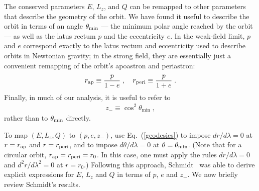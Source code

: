 \documentclass[aps,prd,twocolumn,showpacs,groupedaddress,nofootinbib]{revtex4}
\begin{document}
The conserved parameters $E$, $L_z$, and $Q$ can be remapped to other
parameters that describe the geometry of the orbit.  We have found it
useful to describe the orbit in terms of an angle $\theta_{\rm min}$
--- the minimum polar angle reached by the orbit --- as well as the
latus rectum $p$ and the eccentricity $e$.  In the weak-field limit,
$p$ and $e$ correspond exactly to the latus rectum and eccentricity
used to describe orbits in Newtonian gravity; in the strong field,
they are essentially just a convenient remapping of the orbit's
apoastron and periastron:
\begin{equation}
r_{\rm ap}\equiv\frac{p}{1-e}\;,\quad r_{\rm
peri}\equiv\frac{p}{1+e}\;.
\end{equation}
Finally, in much of our analysis, it is useful to refer to
\begin{gather}
z_{-}\equiv\cos^2\theta_{\min}\;,
\end{gather}
rather than to $\theta_{\rm min}$ directly.

To map $(E,L_z,Q)$ to $(p,e,z_{-})$, use Eq.\ (\ref{geodesics}) to
impose ${dr}/{d\lambda}=0$ at $r=r_{\rm ap}$ and $r=r_{\rm peri}$, and
to impose ${d\theta}/{d\lambda}=0$ at $\theta = \theta_{\rm min}$.
(Note that for a circular orbit, $r_{\rm ap} = r_{\rm peri} = r_0$.
In this case, one must apply the rules ${dr}/{d\lambda}=0$ and
${d^2r}/{d\lambda^2}=0$ at $r=r_0$.)  Following this approach,
Schmidt~\cite{schmidt} was able to derive explicit expressions for
$E$, $L_z$ and $Q$ in terms of $p$, $e$ and $z_{-}$.  We now briefly
review Schmidt's results.
 
\end{document}
